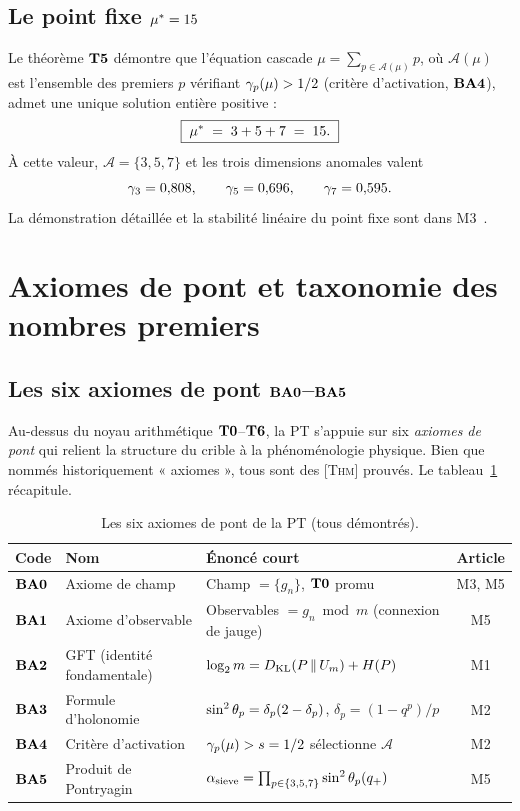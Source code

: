\subsection{Le point fixe \texorpdfstring{$\mu^{*} = 15$}{μ*=15}}
\label{sec:crible:mustar}

Le théorème $\textbf{T5}$ démontre que l'équation cascade $\mu = \sum_{p \in \mathcal A(\mu)} p$, où $\mathcal A(\mu)$ est l'ensemble des premiers $p$ vérifiant $\gamma_{p}(\mu) > 1/2$ (critère d'activation, $\textbf{BA4}$), admet une unique solution entière positive :
\[
\boxed{\;\mu^{*} \;=\; 3 + 5 + 7 \;=\; 15.\;}
\]
À cette valeur, $\mathcal A = \{3, 5, 7\}$ et les trois dimensions anomales valent
\[
\gamma_{3} = 0{,}808, \qquad \gamma_{5} = 0{,}696, \qquad \gamma_{7} = 0{,}595.
\]
La démonstration détaillée et la stabilité linéaire du point fixe sont dans M3~\cite{companion_M3}.

\section{Axiomes de pont et taxonomie des nombres premiers}
\label{sec:bridge}

\subsection{Les six axiomes de pont \texorpdfstring{$\textbf{BA0}$--$\textbf{BA5}$}{BA0-BA5}}
\label{sec:bridge:BAn}

Au-dessus du noyau arithmétique $\textbf{T0}$--$\textbf{T6}$, la PT s'appuie sur six \emph{axiomes de pont} qui relient la structure du crible à la phénoménologie physique. Bien que nommés historiquement « axiomes », tous sont des \textsc{[Thm]} prouvés. Le tableau~\ref{tab:BAn} récapitule.

\begin{table}[htbp]
\centering
\small
\begin{tabular}{@{}lp{4.5cm}p{4.5cm}c@{}}
\toprule
Code & Nom & Énoncé court & Article \\
\midrule
$\textbf{BA0}$ & Axiome de champ & Champ $= \{g_n\}$, $\textbf{T0}$ promu & M3, M5 \\
$\textbf{BA1}$ & Axiome d'observable & Observables $= g_n \bmod m$ (connexion de jauge) & M5 \\
$\textbf{BA2}$ & GFT (identité fondamentale) & $\log_2 m = D_{\rm KL}(P\,\|\,U_m) + H(P)$ & M1 \\
$\textbf{BA3}$ & Formule d'holonomie & $\sin^{2}\theta_{p} = \delta_p(2 - \delta_p)$, $\delta_p = (1 - q^p)/p$ & M2 \\
$\textbf{BA4}$ & Critère d'activation & $\gamma_{p}(\mu) > s = 1/2$ sélectionne $\mathcal A$ & M2 \\
$\textbf{BA5}$ & Produit de Pontryagin & $\alpha_{\rm sieve} = \prod_{p \in \{3,5,7\}} \sin^{2}\theta_{p}(q_{+})$ & M5 \\
\bottomrule
\end{tabular}
\caption{Les six axiomes de pont de la PT (tous démontrés).}
\label{tab:BAn}
\end{table}

